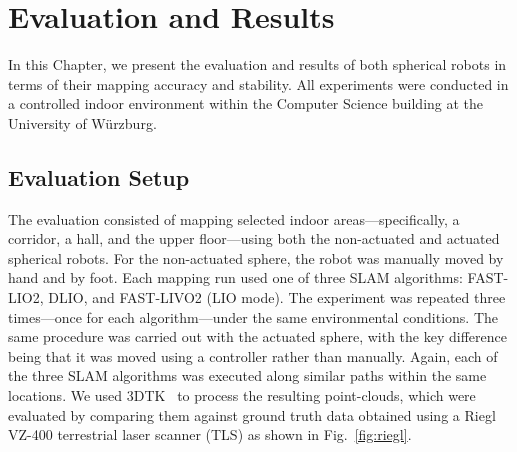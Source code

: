 \documentclass[english, bachelor, utf8]{base/thesis_telematics}
\begin{document}
\chapter{Evaluation and Results}
\label{sec:evaluation}

In this Chapter, we present the evaluation and results of both spherical robots in terms of their mapping accuracy and stability.
All experiments were conducted in a controlled indoor environment within the Computer Science building at the University of Würzburg.

\section{Evaluation Setup}
The evaluation consisted of mapping selected indoor areas—specifically, a corridor, a hall, and the upper floor—using both the non-actuated and actuated spherical robots. 
For the non-actuated sphere, the robot was manually moved by hand and by foot. 
Each mapping run used one of three SLAM algorithms: FAST-LIO2, DLIO, and FAST-LIVO2 (LIO mode). 
The experiment was repeated three times—once for each algorithm—under the same environmental conditions. 
The same procedure was carried out with the actuated sphere, with the key difference being that it was moved using a controller rather than manually. 
Again, each of the three SLAM algorithms was executed along similar paths within the same locations. 
We used 3DTK~\cite{3dtk} to process the resulting point-clouds, which were evaluated by comparing them against ground truth data obtained using a Riegl VZ-400 terrestrial laser scanner (TLS) as shown in Fig.~\ref{fig:riegl}.
\end{document}
